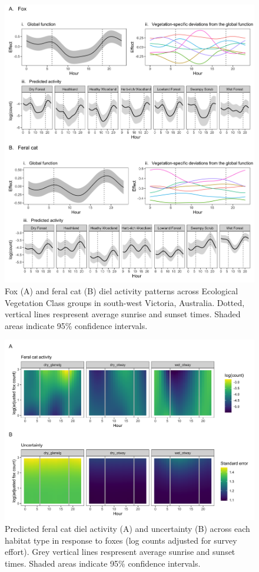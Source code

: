\documentclass[]{elsarticle} %
\begin{document}
\begin{figure}
\includegraphics[width=1\linewidth]{../figs/predator_veg} \caption{Fox (A) and feral cat (B) diel activity patterns across Ecological Vegetation Class groups in south-west Victoria, Australia. Dotted, vertical lines respresent average sunrise and sunset times. Shaded areas indicate 95\% confidence intervals.}\label{fig:veg}
\end{figure}

\newpage

\begin{figure}
\includegraphics[width=1\linewidth]{../figs/cat_fox_count} \caption{Predicted feral cat diel activity (A) and uncertainty (B) across each habitat type in response to foxes (log counts adjusted for survey effort). Grey vertical lines respresent average sunrise and sunset times. Shaded areas indicate 95\% confidence intervals.}\label{fig:count}
\end{figure}
\end{document}
